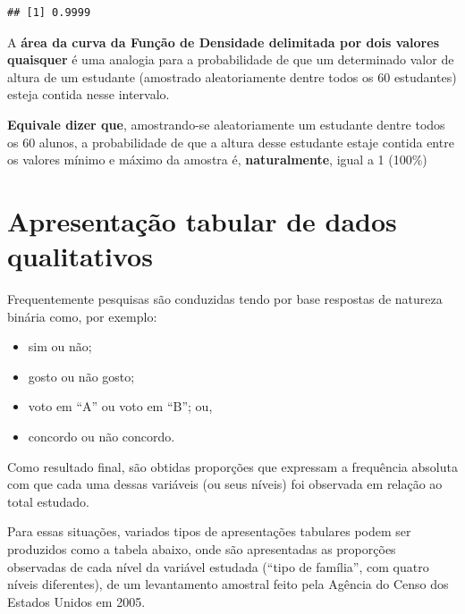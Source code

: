 \documentclass[
]{book}
\providecommand{\tightlist}{%
  \setlength{\itemsep}{0pt}\setlength{\parskip}{0pt}}
\begin{document}
\begin{verbatim}
## [1] 0.9999
\end{verbatim}

\hfill\break

A \textbf{área da curva da Função de Densidade delimitada por dois valores quaisquer} é uma analogia para a probabilidade de que um determinado valor de altura de um estudante (amostrado aleatoriamente dentre todos os 60 estudantes) esteja contida nesse intervalo.

\hfill\break

\textbf{Equivale dizer que}, amostrando-se aleatoriamente um estudante dentre todos os 60 alunos, a probabilidade de que a altura desse estudante estaje contida entre os valores mínimo e máximo da amostra é, \textbf{naturalmente}, igual a 1 (100\%)

\hfill\break

\hypertarget{apresentauxe7uxe3o-tabular-de-dados-qualitativos}{%
\section{Apresentação tabular de dados qualitativos}\label{apresentauxe7uxe3o-tabular-de-dados-qualitativos}}

\hfill\break

Frequentemente pesquisas são conduzidas tendo por base respostas de natureza binária como, por exemplo:

\hfill\break

\begin{itemize}
\tightlist
\item
  sim ou não;
\item
  gosto ou não gosto;
\item
  voto em ``A'' ou voto em ``B''; ou,
\item
  concordo ou não concordo.
\end{itemize}

\hfill\break

Como resultado final, são obtidas proporções que expressam a frequência absoluta com que cada uma dessas variáveis (ou seus níveis) foi observada em relação ao total estudado.

\hfill\break

Para essas situações, variados tipos de apresentações tabulares podem ser produzidos como a tabela abaixo, onde são apresentadas as proporções observadas de cada nível da variável estudada (``tipo de família'', com quatro níveis diferentes), de um levantamento amostral feito pela Agência do Censo dos Estados Unidos em 2005.
\end{document}
